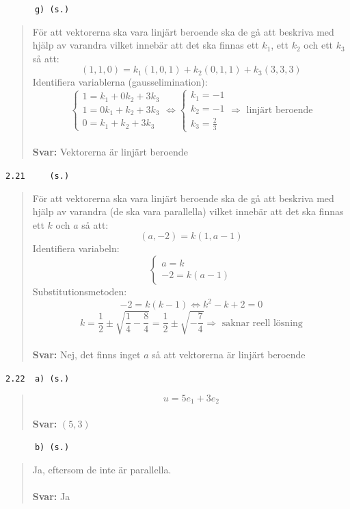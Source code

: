 \documentclass[a4paper]{article}
\newcommand{\tskcol}[1]{\textcolor{tskcol}{#1}}
\begin{document}
\texttt{\tskcol{~~~~~~g) (s.)}}
\begin{quotation}
	\noindent
	För att vektorerna ska vara linjärt beroende ska de gå att beskriva med hjälp av varandra vilket innebär att det ska finnas ett $k_1$, ett $k_2$ och ett $k_3$ så att:
	\[(1,1,0)=k_1(1,0,1)+k_2(0,1,1)+k_3(3,3,3)\]
	Identifiera variablerna (gausselimination):
	\[\begin{cases}
	1=k_1+0k_2+3k_3 \\
	1=0k_1+k_2+3k_3 \\
	0=k_1+k_2+3k_3
	\end{cases} \Leftrightarrow
	\begin{cases}
	k_1=-1 \\
	k_2=-1 \\
	k_3=\frac{2}{3}
	\end{cases}\Rightarrow \text{ linjärt beroende}\]
	\\
	\textbf{Svar:} Vektorerna är linjärt beroende
\end{quotation}

\texttt{\tskcol{2.21~~~~ (s.)}}
\begin{quotation}
	\noindent
	För att vektorerna ska vara linjärt beroende ska de gå att beskriva med hjälp av varandra (de ska vara parallella) vilket innebär att det ska finnas ett $k$ och $a$ så att:
	\[(a,-2)=k(1,a-1)\]
	Identifiera variabeln:
	\[\begin{cases}
	a=k \\
	-2=k(a-1)
	\end{cases}\]
	Substitutionsmetoden:
	\[-2=k(k-1) \Leftrightarrow
	k^2-k+2=0\]
	\[k=\frac{1}{2}\pm\sqrt{\frac{1}{4}-\frac{8}{4}}=\frac{1}{2}\pm\sqrt{-\frac{7}{4}} \Rightarrow \text{ saknar reell lösning}\]
	\\
	\textbf{Svar:} Nej, det finns inget $a$ så att vektorerna är linjärt beroende
\end{quotation}

\texttt{\tskcol{2.22~~a) (s.)}}
\begin{quotation}
	\noindent
	\[u=5e_1+3e_2\]
	\\
	\textbf{Svar:} $(5,3)$
\end{quotation}

\texttt{\tskcol{~~~~~~b) (s.)}}
\begin{quotation}
	\noindent
	Ja, eftersom de inte är parallella.
	\\ \\
	\textbf{Svar:} Ja
\end{quotation}
\end{document}
